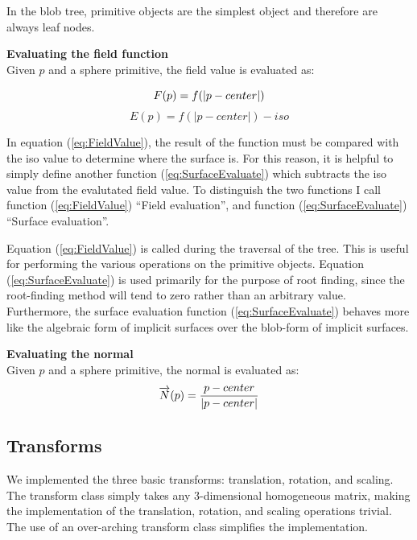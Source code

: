 \documentclass[conference]{acmsiggraph}
\begin{document}
In the blob tree, primitive objects are the simplest object and therefore are
always leaf nodes.

\textbf{Evaluating the field function}\\
Given $p$ and a sphere primitive, the field value is evaluated as:

\begin{equation}
F(p) = f(\lvert p - center \rvert)\\
\label{eq:FieldValue}
\end{equation}
\begin{equation}
E(p) = f(\lvert p - center \rvert) - iso
\label{eq:SurfaceEvaluate}
\end{equation}



In equation (\ref{eq:FieldValue}), the result of the function must be compared with
the iso value to determine where the surface is. For this reason, it is helpful
to simply define another function (\ref{eq:SurfaceEvaluate}) which subtracts the
iso value from the evalutated field value. To distinguish the two functions I
call function (\ref{eq:FieldValue}) ``Field evaluation'', and function
(\ref{eq:SurfaceEvaluate}) ``Surface evaluation''.

Equation  (\ref{eq:FieldValue}) is called during the traversal of the tree. This
is useful for performing the various operations on the primitive objects.
Equation (\ref{eq:SurfaceEvaluate}) is used primarily for the purpose of root
finding, since the root-finding method will tend to zero rather than an
arbitrary value. Furthermore, the surface evaluation function
(\ref{eq:SurfaceEvaluate}) behaves more like the algebraic form of implicit
surfaces over the blob-form of implicit surfaces.


\textbf{Evaluating the normal}\\
Given $p$ and a sphere primitive, the normal is evaluated as:
$$ \overrightarrow{N}(p) = {p - center \over \lvert p - center \rvert}$$

\subsection{Transforms}
We implemented the three basic transforms: translation, rotation, and scaling.
The transform class simply takes any 3-dimensional homogeneous matrix, making
the implementation of the translation, rotation, and scaling operations
trivial. The use of an over-arching transform class simplifies the
implementation.
\end{document}
